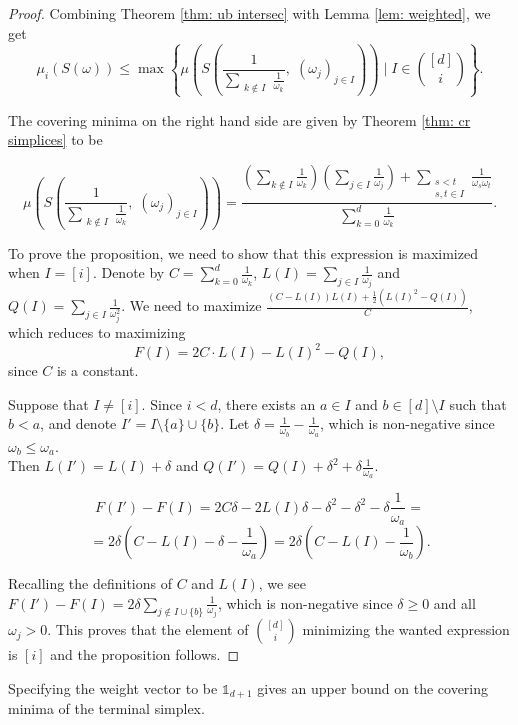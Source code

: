 \documentclass{amsart}
\theoremstyle{definition}
\theoremstyle{remark}
\begin{document}
\begin{proof}
Combining Theorem \ref{thm: ub intersec} with Lemma \ref{lem: weighted}, we get
$$\mu_i(S(\omega))\leqslant \max \left\{ \mu\left(S\left(
\frac{1}{\sum\limits_{\substack{k \notin I}} \frac{1}{\omega_k}},\;
(\omega_j)_{j\in I}
\right)\right)\; | \; I \in {[d]\choose i}\right\}.$$

The covering minima on the right hand side are given by Theorem \ref{thm: cr simplices} to be

$$\mu\left(S\left(
\frac{1}{\sum\limits_{\substack{k \notin I}} \frac{1}{\omega_k}},\;
(\omega_j)_{j\in I}
\right)\right)=  \frac{\left(\sum\limits_{k\notin I}\frac{1}{\omega_k}\right)\left(\sum\limits_{j\in I} \frac{1}{\omega_j}\right)+\sum\limits_{\substack{s<t\\s,t\in I}}\frac{1}{\omega_s\omega_t}}
{\sum\limits_{k=0}^d \frac{1}{\omega_k}}.$$


To prove the proposition, we need to show that this expression is maximized when $I=[i]$. Denote by $C=\sum\limits_{k=0}^d \frac{1}{\omega_k}$, $L(I)=\sum\limits_{j\in I} \frac{1}{\omega_j}$ and $Q(I)=\sum\limits_{j\in I} \frac{1}{\omega_j^2}$. We need to maximize $\frac{(C-L(I))L(I)+\frac{1}{2}(L(I)^2-Q(I))}{C}$, which reduces to maximizing 
$$F(I)=2C\cdot L(I)-L(I)^2-Q(I),$$
 since $C$ is a constant.

Suppose that $I\neq [i]$. Since $i<d$, there exists an $a\in I$ and $b\in [d]\setminus I$ such that $b<a$, and denote $I'=I\setminus \{ a\} \cup \{b\}$. Let $\delta=\frac{1}{\omega_b}-\frac{1}{\omega_a}$, which is non-negative since $\omega_b\leqslant\omega_a$. \\

Then $L(I')=L(I)+\delta$ and $Q(I')=Q(I)+\delta^2+\delta\frac{1}{\omega_a}$.

$$F(I')-F(I)=2C\delta-2L(I)\delta-\delta^2-\delta^2-\delta\frac{1}{\omega_a}=$$
$$=2\delta\left(C-L(I)-\delta-\frac{1}{\omega_a}\right)=2\delta\left(C-L(I)-\frac{1}{\omega_b}\right).$$

Recalling the definitions of $C$ and $L(I)$, we see $F(I')-F(I)=2\delta \sum\limits_{j\notin I\cup \{ b\}} \frac{1}{\omega_j}$, which is non-negative since $\delta\geq 0$ and all $\omega_j>0$. This proves that the element of $[d]\choose i$ minimizing the wanted  expression is $[i]$ and the proposition follows.

\end{proof}

Specifying the weight vector to be $\mathbb{1}_{d+1}$ gives an upper bound on the covering minima of the terminal simplex.
\end{document}
